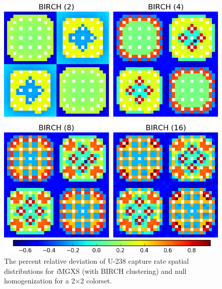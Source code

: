 \begin{figure}[h!]
\centering
\includegraphics[width=0.9\linewidth]{figures/results/compare/2x2/compare-capt}
\vspace{2mm}
\caption[U-238 capture rate \textit{i}MGXS-to-null relative deviations]{The percent relative deviation of U-238 capture rate spatial distributions for \textit{i}\ac{MGXS} (with BIRCH clustering) and null homogenization for a 2$\times$2 colorset.}
\label{fig:chap11-2x2-capt-rates-comp}
\end{figure}

\clearpage

